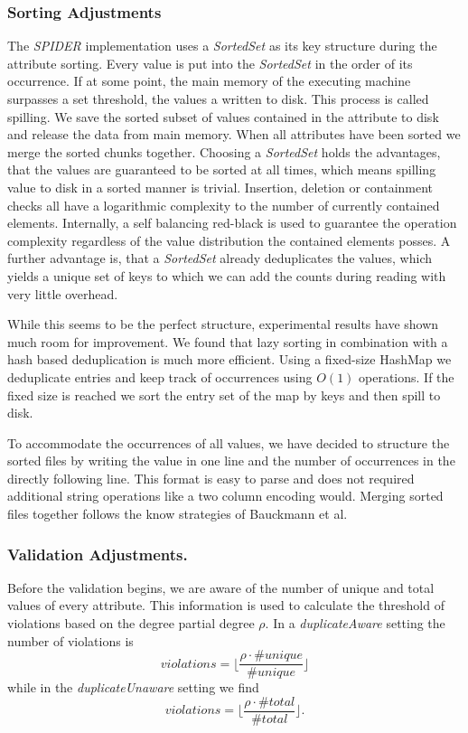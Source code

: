 \subsubsection{\textbf{Sorting Adjustments}}
The \textit{SPIDER} implementation uses a \textit{SortedSet} as its key structure during the attribute sorting. Every value is put into the \textit{SortedSet} in the order of its occurrence. If at some point, the main memory of the executing machine surpasses a set threshold, the values a written to disk. This process is called spilling. We save the sorted subset of values contained in the attribute to disk and release the data from main memory. When all attributes have been sorted we merge the sorted chunks together. Choosing a \textit{SortedSet} holds the advantages, that the values are guaranteed to be sorted at all times, which means spilling value to disk in a sorted manner is trivial. Insertion, deletion or containment checks all have a logarithmic complexity to the number of currently contained elements. Internally, a self balancing red-black is used to guarantee the operation complexity regardless of the value distribution the contained elements posses. A further advantage is, that a \textit{SortedSet} already deduplicates the values, which yields a unique set of keys to which we can add the counts during reading with very little overhead.

While this seems to be the perfect structure, experimental results have shown much room for improvement. We found that lazy sorting in combination with a hash based deduplication is much more efficient. Using a fixed-size HashMap we deduplicate entries and keep track of occurrences using $O(1)$ operations. If the fixed size is reached we sort the entry set of the map by keys and then spill to disk.

To accommodate the occurrences of all values, we have decided to structure the sorted files by writing the value in one line and the number of occurrences in the directly following line. This format is easy to parse and does not required additional string operations like a two column encoding would. Merging sorted files together follows the know strategies of Bauckmann et al.


\subsubsection{\textbf{Validation Adjustments.}}
Before the validation begins, we are aware of the number of unique and total values of every attribute. This information is used to calculate the threshold of violations based on the degree partial degree $\rho$. In a \textit{duplicateAware} setting the number of violations is
$$
violations = \lfloor \frac{\rho \cdot \# unique}{\#unique} \rfloor
$$
while in the \textit{duplicateUnaware} setting we find
$$
violations = \lfloor \frac{\rho \cdot \# total}{\#total}\rfloor.
$$

